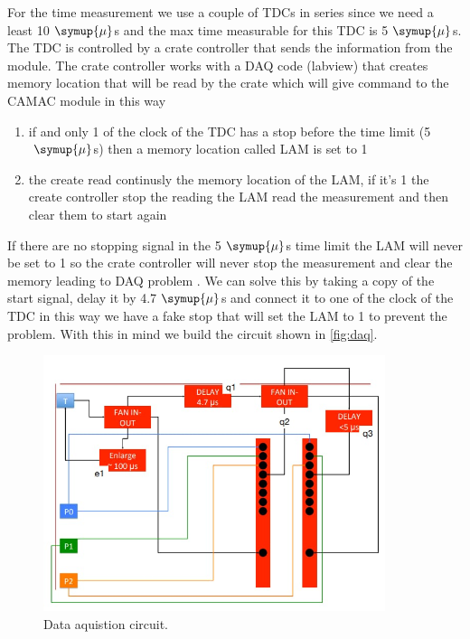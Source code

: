 For the time measurement we use a couple of TDCs in series since we need a least 10$\;\symup{\mu}$s
and the max time measurable for this TDC is 5$\;\symup{\mu}$s.
The TDC is controlled by a crate controller that sends the information 
from the module. The crate controller works with a DAQ code (labview) 
that creates memory location that will be read by the crate which will give command to the
CAMAC module in this way
\begin{enumerate}
  \item if and only 1 of the clock of the TDC has a stop before the time limit (5$\;\symup{\mu}$s) then a memory location called LAM is set to 1
  \item  the create read continusly the memory location of the LAM, if it's 1 the create controller stop the reading the LAM read the measurement and then clear them to start again
\end{enumerate}
 If there are no stopping signal in the 5$\;\symup{\mu}$s time limit the LAM will never be set to 1 so the crate controller will never stop the measurement and clear the memory leading to DAQ problem . We can solve this by taking a copy of the start signal, delay it by 4.7$\;\symup{\mu}$s and connect it to one of the clock of the TDC in this way we have
a fake stop that will set the LAM to 1 to prevent the problem. With this in mind we build the circuit shown in \autoref{fig:daq}.\\
\begin{figure}[h]
\begin{center}
\includegraphics[width=100mm]{figures/cattura4.png}
\end{center}
\caption{Data aquistion circuit.}
\label{fig:daq}
\end{figure}

